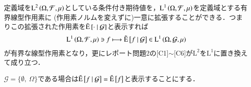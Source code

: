 	\begin{thm}[条件付き期待値の拡張]
		定義域を$\operatorname{L}^{2} \left(\Omega,\mathcal{F},\mu\right)$としている条件付き期待値を，$\operatorname{L}^{1} \left(\Omega,\mathcal{F},\mu\right)$を定義域とする有界線型作用素に
		(作用素ノルムを変えずに)一意に拡張することができる．つまりこの拡張された作用素を$\tilde{\operatorname{E}} \left[ \cdot \ \middle|\ \mathcal{G} \right]$と表示すれば
		\begin{align}
			\operatorname{L}^{1} \left(\Omega,\mathcal{F},\mu\right) \ni f \longmapsto \tilde{\operatorname{E}} \left[ f \ \middle|\ \mathcal{G} \right] \in \operatorname{L}^{1} \left(\Omega,\mathcal{G},\mu\right)
		\end{align}
		が有界な線型作用素となり，更にレポート問題2の[C1]$\sim$[C6]が$\mathrm{L}^2$を$\mathrm{L}^1$に置き換えて成り立つ．
		\label{thm:conditional_exp_expansion}
	\end{thm}
	$\mathcal{G} = \{\emptyset,\ \Omega\}$である場合は$\tilde{\operatorname{E}} \left[ f \ \middle|\ \mathcal{G} \right] = \tilde{\operatorname{E}} \left[ f \right]$と表示することにする．
